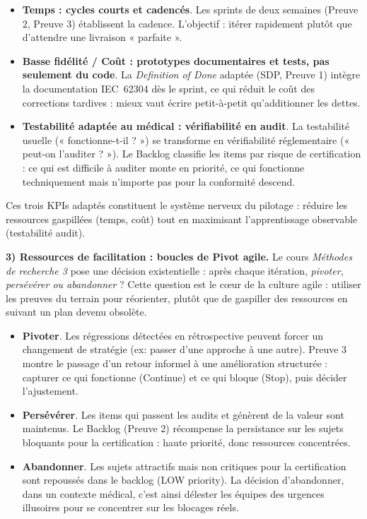 \begin{itemize}
  \item \textbf{Temps : cycles courts et cadencés}. Les sprints de deux semaines (Preuve 2, Preuve 3) établissent la cadence. L'objectif : itérer rapidement plutôt que d'attendre une livraison « parfaite ».
  \item \textbf{Basse fidélité / Coût : prototypes documentaires et tests, pas seulement du code}. La \textit{Definition of Done} adaptée (SDP, Preuve 1) intègre la documentation IEC~62304 dès le sprint, ce qui réduit le coût des corrections tardives : mieux vaut écrire petit-à-petit qu'additionner les dettes.
  \item \textbf{Testabilité adaptée au médical : vérifiabilité en audit}. La testabilité usuelle (« fonctionne-t-il ? ») se transforme en vérifiabilité réglementaire (« peut-on l'auditer ? »). Le Backlog classifie les items par risque de certification : ce qui est difficile à auditer monte en priorité, ce qui fonctionne techniquement mais n'importe pas pour la conformité descend.
\end{itemize}

Ces trois KPIs adaptés constituent le système nerveux du pilotage : réduire les ressources gaspillées (temps, coût) tout en maximisant l'apprentissage observable (testabilité audit).

\textbf{3) Ressources de facilitation : boucles de Pivot agile.}
Le cours \textit{Méthodes de recherche 3} pose une décision existentielle : après chaque itération, \emph{pivoter, persévérer ou abandonner} ? Cette question est le cœur de la culture agile : utiliser les preuves du terrain pour réorienter, plutôt que de gaspiller des ressources en suivant un plan devenu obsolète.

\begin{itemize}
  \item \textbf{Pivoter}. Les régressions détectées en rétrospective peuvent forcer un changement de stratégie (ex: passer d'une approche à une autre). Preuve 3 montre le passage d'un retour informel à une amélioration structurée : capturer ce qui fonctionne (Continue) et ce qui bloque (Stop), puis décider l'ajustement.
  \item \textbf{Persévérer}. Les items qui passent les audits et génèrent de la valeur sont maintenus. Le Backlog (Preuve 2) récompense la persistance sur les sujets bloquants pour la certification : haute priorité, donc ressources concentrées.
  \item \textbf{Abandonner}. Les sujets attractifs mais non critiques pour la certification sont repoussés dans le backlog (LOW priority). La décision d'abandonner, dans un contexte médical, c'est ainsi délester les équipes des urgences illusoires pour se concentrer sur les blocages réels.
\end{itemize}

